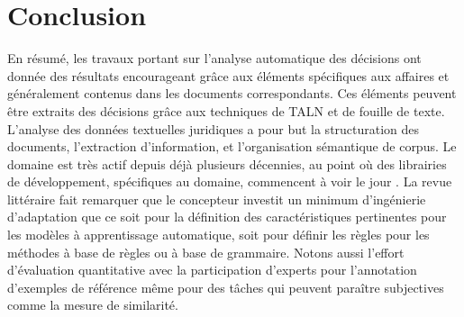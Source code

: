 \section{Conclusion}
\label{sec:literature:conclusion}
En résumé, les travaux portant sur l'analyse automatique des décisions ont donnée des résultats encourageant grâce aux éléments spécifiques aux affaires et généralement contenus dans les documents correspondants. Ces éléments peuvent être extraits des décisions grâce aux techniques de TALN et de fouille de texte.  L'analyse des données textuelles juridiques a pour but la structuration des documents, l'extraction d'information, et l'organisation sémantique de corpus. Le domaine est très actif depuis déjà plusieurs décennies, au point où des librairies de développement, spécifiques au domaine, commencent à voir le jour \citep{bommarito2018lexnlp}. La revue littéraire fait remarquer que le concepteur investit un minimum d'ingénierie d'adaptation que ce soit pour la définition des caractéristiques pertinentes pour les modèles à apprentissage automatique, soit pour définir les règles pour les méthodes à base de règles ou à base de grammaire. Notons aussi l'effort d'évaluation quantitative avec la participation d'experts pour l'annotation d'exemples de référence même pour des tâches qui peuvent paraître subjectives comme la mesure de similarité.



